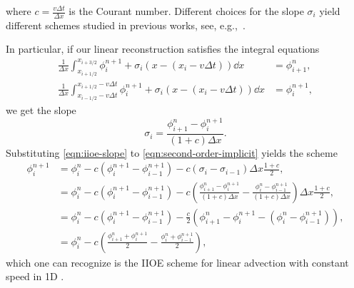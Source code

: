 \documentclass[../thesis.tex]{subfiles}
\begin{document}
where \(c = \frac{v\Delta t}{\Delta x}\) is the Courant number.
Different choices for the slope \(\sigma_{i}\)
yield different schemes studied in previous works,
see, e.g.,~\cite{2018_Frolkovic,2023_Frolkovic,2014_Mikula}.

In particular, if our linear reconstruction satisfies the integral equations
\begin{equation}
    \begin{split}
        \frac{1}{\Delta x}
        \int_{x_{i+1/2}}^{x_{i+3/2}}
        \phi_{i}^{n+1} + \sigma_{i}
        \left( x - (x_{i}-v\Delta t) \right)\dd{x}
        &= \phi_{i+1}^{n},
        \\
        \frac{1}{\Delta x}
        \int_{x_{i-1/2}-v\Delta t}^{x_{i+1/2}-v\Delta t}
        \phi_{i}^{n+1} + \sigma_{i}
        \left( x - (x_{i}-v\Delta t) \right)\dd{x}
        &= \phi_{i}^{n+1},
    \end{split}
\end{equation}
we get the slope
\begin{equation}
    \label{eqn:iioe-slope}
    \sigma_{i} = \frac{\phi_{i+1}^{n} - \phi_{i}^{n+1}}{(1+c)\Delta x}.
\end{equation}
Substituting \eqref{eqn:iioe-slope} to \eqref{eqn:second-order-implicit} yields the scheme
\begin{equation}\label{eqn:iioe-1d}
    \begin{split}
        \phi_{i}^{n+1}
        &= \phi_{i}^{n} - c\left(
            \phi_{i}^{n+1}
            - \phi_{i-1}^{n+1}
            \right)
            -c\left(
            \sigma_{i} - \sigma_{i-1}
            \right)\Delta x\frac{1+c}{2},
        \\
        &= \phi_{i}^{n} - c\left(
            \phi_{i}^{n+1}
            - \phi_{i-1}^{n+1}
            \right)
            -c\left(
                \frac{\phi_{i+1}^{n} - \phi_{i}^{n+1}}{(1+c)\Delta x}
                - \frac{\phi_{i}^{n} - \phi_{i-1}^{n+1}}{(1+c)\Delta x}
            \right)\Delta x\frac{1+c}{2},
        \\
        &= \phi_{i}^{n} - c\left(
            \phi_{i}^{n+1}
            - \phi_{i-1}^{n+1}
            \right)
            -\frac{c}{2}\left(
                \phi_{i+1}^{n} - \phi_{i}^{n+1}
                - (\phi_{i}^{n} - \phi_{i-1}^{n+1})
            \right),
        \\
        &= \phi_{i}^{n}
            -c\left(
                \frac{\phi_{i+1}^{n} + \phi_{i}^{n+1}}{2}
                - \frac{\phi_{i}^{n} + \phi_{i-1}^{n+1}}{2}
            \right),
    \end{split}
\end{equation}
which one can recognize is the IIOE scheme for linear advection with constant speed in 1D \cite{2014_Mikula,2018_Frolkovic,2020_Ibolya_CONF}.
\end{document}
